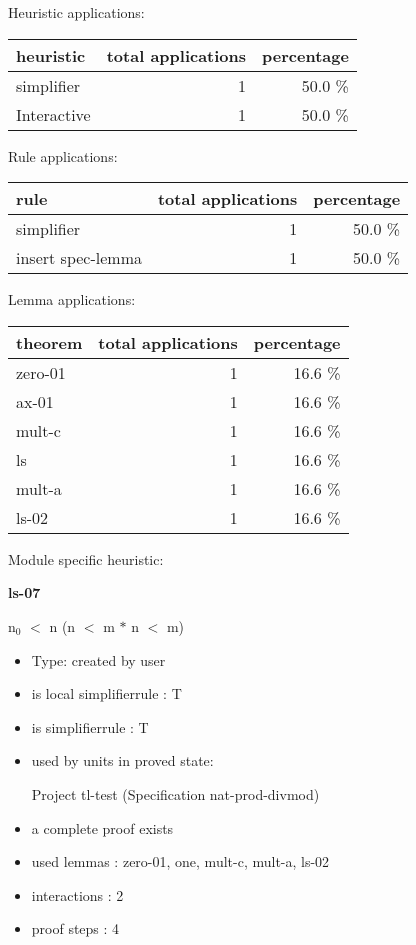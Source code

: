 \documentclass[a4paper]{article}
\begin{document}
Heuristic applications:

\begin{supertabular}{l|r|r}
heuristic	& total applications & percentage \\ \hline
simplifier & 1 & 50.0 \% \\
Interactive & 1 & 50.0 \% \\

\end{supertabular}

Rule applications:

\begin{supertabular}{l|r|r}
rule	        & total applications & percentage \\ \hline
simplifier & 1 & 50.0 \% \\
insert spec-lemma & 1 & 50.0 \% \\

\end{supertabular}

Lemma applications:

\begin{supertabular}{l|r|r}
theorem	        & total applications & percentage \\ \hline
zero-01 & 1 & 16.6 \% \\
ax-01 & 1 & 16.6 \% \\
mult-c & 1 & 16.6 \% \\
ls & 1 & 16.6 \% \\
mult-a & 1 & 16.6 \% \\
ls-02 & 1 & 16.6 \% \\

\end{supertabular}

Module specific heuristic:

\pagebreak

{\LARGE\bf ls-07}\label{lemma-ls-07}

\medskip

 \Fol $\mbox{n}_{0}$ $<$ n \Imp (n $<$ m $*$ n  $<$ m)

\begin{itemize}

\item Type: created by user

\item is local simplifierrule : T
\item is simplifierrule : T
\item used by units in proved state:

Project tl-test (Specification nat-prod-divmod)
\item       a complete proof exists
\item       used lemmas  : zero-01, one, mult-c, mult-a, ls-02
\item       interactions : 2
\item       proof steps  : 4
\end{itemize}
\end{document}
